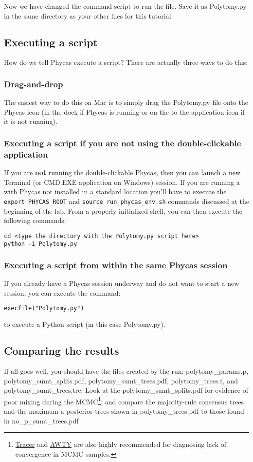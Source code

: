 \documentclass{article}
\newcommand{\cmd}[1]{\texttt{#1}\xspace}
\newcommand{\phycas}{Phycas\xspace}
\newcommand{\localfile}[1]{\textsf{#1}\xspace}
\begin{document}
Now we have changed the command script to run the file. Save it as \localfile{Polytomy.py} in the same directory as your other files for this tutorial.

\subsection{Executing a script}
How do we tell \phycas execute a script?
There are actually three ways to do this:
\subsubsection{Drag-and-drop}
The easiest way to do this on Mac is to simply drag the \localfile{Polytomy.py} file onto the \phycas icon (in the dock if \phycas is running or on the to the application icon if it is not running).

\subsubsection{Executing a script if you are not using the double-clickable application}
If you are {\bf not} running the double-clickable \phycas, then you can launch a new
Terminal (or CMD.EXE application on Windows) session.
If you are running a with \phycas not installed in a standard location you'll have to execute the \cmd{export PHYCAS\_ROOT} and \cmd{source run\_phycas\_env.sh} commands discussed at the beginning of the lab.
From a properly initialized shell, you can then execute the following commands:
\begin{verbatim}
cd <type the directory with the Polytomy.py script here>
python -i Polytomy.py
\end{verbatim}


\subsubsection{Executing a script from within the same \phycas session}
If you already have a \phycas session underway and do not want to start a
new session, you can execute the command:
\begin{verbatim}
execfile("Polytomy.py")
\end{verbatim}
to execute a Python script (in this case  \localfile{Polytomy.py}).


\subsection{Comparing the results}
If all goes well, you should have the files created by the run:
\localfile{polytomy\_params.p}, \localfile{polytomy\_sumt\_splits.pdf}, \localfile{polytomy\_sumt\_trees.pdf}, \localfile{polytomy\_trees.t}, and \localfile{polytomy\_sumt\_trees.tre}.
Look at the \localfile{polytomy\_sumt\_splits.pdf}  for evidence of poor mixing during the MCMC\footnote{
\href{http://beast.bio.ed.ac.uk/}{Tracer} and \href{http://ceb.csit.fsu.edu/awty}{AWTY} are also highly
recommended for diagnosing lack of convergence in MCMC samples.}; 
and compare the majority-rule consensus trees and the maximum a posterior trees shown in  \localfile{polytomy\_trees.pdf} to those found in \localfile{no\_p\_sumt\_trees.pdf}
\end{document}

